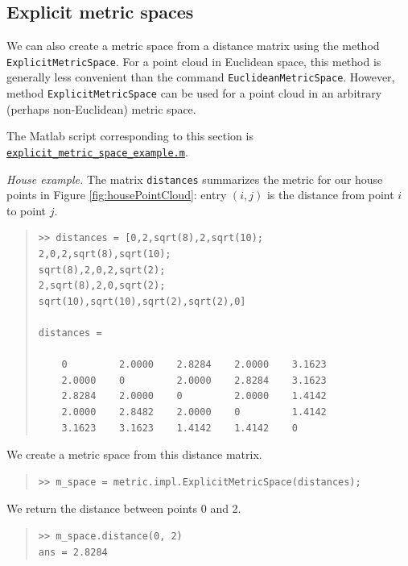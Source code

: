 \documentclass[amscd, amssymb, verbatim]{amsart}[12pt]
\theoremstyle{remark}
\theoremstyle{remark}
\theoremstyle{remark}
\begin{document}
\subsection{Explicit metric spaces}
We can also create a metric space from a distance matrix using the method \texttt{ExplicitMetricSpace}. For a point cloud in Euclidean space, this method is generally less convenient than the command \texttt{EuclideanMetricSpace}. However, method \texttt{ExplicitMetricSpace} can be used for a point cloud in an arbitrary (perhaps non-Euclidean) metric space. 

The Matlab script corresponding to this section is \href{https://github.com/appliedtopology/javaplex/tree/master/src/matlab/for_distribution/tutorial_examples/explicit_metric_space_example.m}{\texttt{explicit\_metric\_space\_example.m}}. 

{\em House example.} The matrix \texttt{distances} summarizes the metric for our house points in Figure \ref{fig:housePointCloud}: entry $(i,j)$ is the distance from point $i$ to point $j$. 

\begin{quote} \begin{verbatim}
>> distances = [0,2,sqrt(8),2,sqrt(10);
2,0,2,sqrt(8),sqrt(10);
sqrt(8),2,0,2,sqrt(2);
2,sqrt(8),2,0,sqrt(2);
sqrt(10),sqrt(10),sqrt(2),sqrt(2),0]

distances =

    0         2.0000    2.8284    2.0000    3.1623
    2.0000    0         2.0000    2.8284    3.1623
    2.8284    2.0000    0         2.0000    1.4142
    2.0000    2.8482    2.0000    0         1.4142
    3.1623    3.1623    1.4142    1.4142    0
\end{verbatim} \end{quote}

We create a metric space from this distance matrix.

\begin{quote} \begin{verbatim}
>> m_space = metric.impl.ExplicitMetricSpace(distances);
\end{verbatim} \end{quote}

We return the distance between points 0 and 2.

\begin{quote} \begin{verbatim}
>> m_space.distance(0, 2)
ans = 2.8284 
\end{verbatim} \end{quote}
\end{document}
